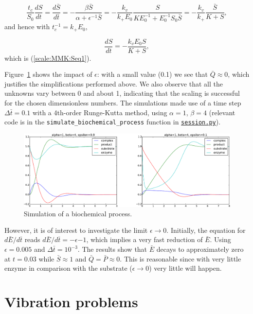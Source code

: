 \documentclass[graybox,envcountchap,sectrefs,final]{svmonodo}
\begin{document}
\[
\frac{t_c}{S_0}\frac{d S}{dt} =
\frac{d\bar S}{d\bar t}  =
-\frac{\beta\bar S}{\alpha + \epsilon^{-1}\bar S}
= -\frac{k_v}{k_+E_0}\frac{S}{KE_0^{-1} + E_0^{-1}S_0\bar S}
= -\frac{k_v}{k_+}\frac{\bar S}{K + S},\]
and hence with $t_c^{-1}=k_+E_0$,

\[ \frac{dS}{dt} = -\frac{k_vE_0 S}{K + S},\]
which is (\ref{scale:MMK:Seq1}).

Figure~\ref{scale:MMK:fig} shows the impact of $\epsilon$: with a small
value (0.1) we see that $\bar Q\approx 0$, which justifies the
simplifications performed above. We also observe that all the unknowns
vary between 0 and about 1, indicating that the scaling is successful
for the chosen dimensionless numbers. The simulations made use of
a time step $\Delta\bar t=0.1$ with a 4th-order Runge-Kutta method,
using $\alpha=1$, $\beta=4$ (relevant code is in the
\Verb!simulate_biochemical_process! function in \href{{http://tinyurl.com/o8pb3yy/session.py}}{\nolinkurl{session.py}}).


\begin{figure}[!ht]  %
  \centerline{\includegraphics[width=1.0\linewidth]{fig-scaling/biochem.pdf}}
  \caption{
  Simulation of a biochemical process. \label{scale:MMK:fig}
  }
\end{figure}


However, it is of interest to investigate the limit $\epsilon\rightarrow 0$.
Initially, the equation for $d\bar E/d\bar t$ reads
$d\bar E/d\bar t = -\epsilon{-1}$, which implies a very fast reduction of
$\bar E$. Using $\epsilon=0.005$ and $\Delta\bar t = 10^{-3}$. The results
show that $\bar E$ decays to approximately zero at $t=0.03$ while
$\bar S\approx 1$ and $\bar Q = \bar P\approx 0$. This is reasonable since with
very little enzyme in comparison with the substrate ($\epsilon\rightarrow 0$)
very little will happen.

\section{Vibration problems}
\label{sec:scale:vib}
\end{document}

